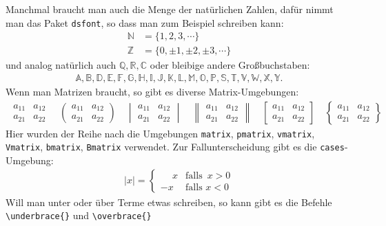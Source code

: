 Manchmal braucht man auch die Menge der natürlichen Zahlen, dafür nimmt man das Paket \texttt{dsfont}, so dass man zum Beispiel schreiben kann:
%
\begin{align}
\mathds{N} & = \{1, 2, 3, \cdots \} \\
\mathds{Z} & = \{0, \pm 1, \pm 2, \pm 3, \cdots \}
\end{align}
%
und analog natürlich auch $\mathds{Q, R, C}$ oder bleibige andere Großbuchstaben: 
%
\begin{align*}
\mathds{A, B, D, E, F, G, H, I, J, K, L, M, O, P, S, T, V, W, X, Y}.
\end{align*}
%
Wenn man Matrizen braucht, so gibt es diverse Matrix-Umgebungen:
%
\begin{align*} 
\begin{matrix} a_{11} & a_{12} \\ a_{21} & a_{22} \end{matrix} \quad  
\begin{pmatrix} a_{11} & a_{12} \\ a_{21} & a_{22} \end{pmatrix} \quad  \begin{vmatrix} a_{11} & a_{12} \\ a_{21} & a_{22} \end{vmatrix} \quad  \begin{Vmatrix} a_{11} & a_{12} \\ a_{21} & a_{22} \end{Vmatrix} \quad  \begin{bmatrix} a_{11} & a_{12} \\ a_{21} & a_{22} \end{bmatrix} \quad  \begin{Bmatrix} a_{11} & a_{12} \\ a_{21} & a_{22} \end{Bmatrix} \quad  \end{align*}
%
Hier wurden der Reihe nach die Umgebungen \texttt{matrix}, \texttt{pmatrix}, \texttt{vmatrix}, \texttt{Vmatrix}, \texttt{bmatrix}, \texttt{Bmatrix} verwendet. Zur Fallunterscheidung gibt es die \texttt{cases}-Umgebung:
%
\begin{align*}
|x| = \begin{cases}
\phantom{-}x & \text{falls } \, x>0 \\ -x & \text{falls } x< 0
\end{cases}
\end{align*}
%
Will man unter oder über Terme etwas schreiben, so kann gibt es die Befehle {\lstinline!\underbrace{}!} und {\lstinline!\overbrace{}!}
